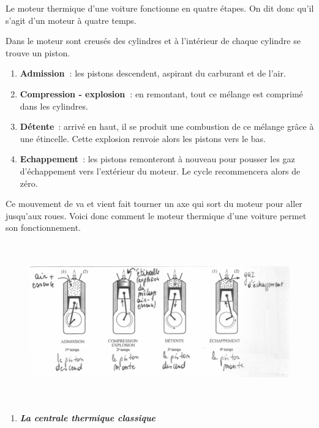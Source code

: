 Le moteur thermique d'une voiture fonctionne en quatre étapes. On dit
donc qu'il s'agit d'un moteur à quatre temps.

Dans le moteur sont creusés des cylindres et à l'intérieur de chaque
cylindre se trouve un piston.

\begin{enumerate}
\def\labelenumi{\arabic{enumi}.}
\tightlist
\item
  \textbf{Admission~}: les pistons descendent, aspirant du carburant et
  de l'air.
\item
  \textbf{Compression - explosion~}: en remontant, tout ce mélange est
  comprimé dans les cylindres.
\item
  \textbf{Détente}~: arrivé en haut, il se produit une combustion de ce
  mélange grâce à une étincelle. Cette explosion renvoie alors les
  pistons vers le bas.
\item
  \textbf{Echappement}~: les pistons remonteront à nouveau pour pousser
  les gaz d'échappement vers l'extérieur du moteur. Le cycle
  recommencera alors de zéro.
\end{enumerate}

Ce mouvement de va et vient fait tourner un axe qui sort du moteur pour
aller jusqu'aux roues. Voici donc comment le moteur thermique d'une
voiture permet son fonctionnement.

\begin{figure}
\centering
\includegraphics[width=15.946cm,height=6.844cm]{Pictures/10000001000001ED000000D356E01F68F1130F39.png}
\caption{}
\end{figure}

\begin{enumerate}
\def\labelenumi{\alph{enumi})}
\tightlist
\item
  \emph{\textbf{La centrale thermique classique}}
\end{enumerate}

